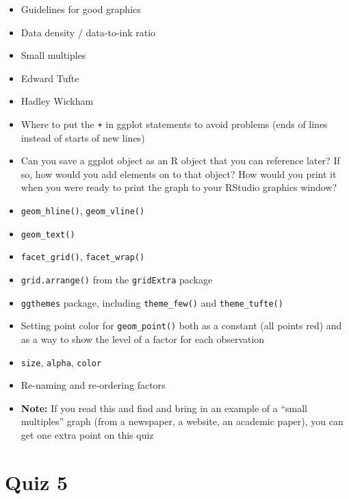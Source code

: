 \documentclass[]{book}
\providecommand{\tightlist}{%
  \setlength{\itemsep}{0pt}\setlength{\parskip}{0pt}}
\theoremstyle{definition}
\theoremstyle{definition}
\theoremstyle{definition}
\theoremstyle{remark}
\begin{document}
\begin{itemize}
\tightlist
\item
  Guidelines for good graphics
\item
  Data density / data-to-ink ratio
\item
  Small multiples
\item
  Edward Tufte
\item
  Hadley Wickham
\item
  Where to put the \texttt{+} in ggplot statements to avoid problems
  (ends of lines instead of starts of new lines)
\item
  Can you save a ggplot object as an R object that you can reference
  later? If so, how would you add elements on to that object? How would
  you print it when you were ready to print the graph to your RStudio
  graphics window?
\item
  \texttt{geom\_hline()}, \texttt{geom\_vline()}
\item
  \texttt{geom\_text()}
\item
  \texttt{facet\_grid()}, \texttt{facet\_wrap()}
\item
  \texttt{grid.arrange()} from the \texttt{gridExtra} package
\item
  \texttt{ggthemes} package, including \texttt{theme\_few()} and
  \texttt{theme\_tufte()}
\item
  Setting point color for \texttt{geom\_point()} both as a constant (all
  points red) and as a way to show the level of a factor for each
  observation
\item
  \texttt{size}, \texttt{alpha}, \texttt{color}
\item
  Re-naming and re-ordering factors
\item
  \textbf{Note:} If you read this and find and bring in an example of a
  ``small multiples'' graph (from a newspaper, a website, an academic
  paper), you can get one extra point on this quiz
\end{itemize}

\section{Quiz 5}\label{quiz-5}
\end{document}
